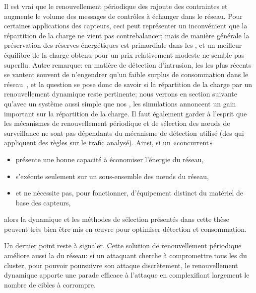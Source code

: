 Il est vrai que le renouvellement périodique des \cns rajoute des contraintes et augmente le volume des messages de contrôles à échanger dans le réseau.
Pour certaines applications des capteurs, ceci peut représenter un inconvénient que la répartition de la charge ne vient pas contrebalancer; mais de manière générale la préservation des réserves énergétiques est primordiale dans les \rcs, et un meilleur équilibre de la charge obtenu pour un prix relativement modeste ne semble pas superflu.
Autre remarque: en matière de détection d'intrusion, les \IDS les plus récents se vantent souvent de n'engendrer qu'un faible surplus de consommation dans le réseau~\cite{LZYP08}, et la question se pose donc de savoir si la répartition de la charge par un renouvellement dynamique reste pertinente; nous verrons en section suivante qu'avec un système aussi simple que nos \cns, les simulations annoncent un gain important sur la répartition de la charge.
Il faut également garder à l'esprit que les mécanismes de renouvellement périodique et de sélection des nœuds de surveillance ne sont pas dépendants du mécanisme de détection utilisé (\cad des \cns qui appliquent des règles sur le trafic analysé).
Ainsi, si un \IDS «concurrent»
\begin{itemize}
    \item présente une bonne capacité à économiser l'énergie du réseau,
    \item s'exécute seulement sur un sous-ensemble des nœuds du réseau,
    \item et ne nécessite pas, pour fonctionner, d'équipement distinct du matériel de base des capteurs,
\end{itemize}
alors la dynamique et les méthodes de sélection présentés dans cette thèse peuvent très bien être mis en œuvre pour optimiser détection et consommation.

Un dernier point reste à signaler.
Cette solution de renouvellement périodique améliore aussi la \secu du réseau: si un attaquant cherche à compromettre tous les \cns du cluster, pour pouvoir poursuivre son attaque discrètement, le renouvellement dynamique apporte une parade efficace à l'attaque en complexifiant largement le nombre de cibles à corrompre.

